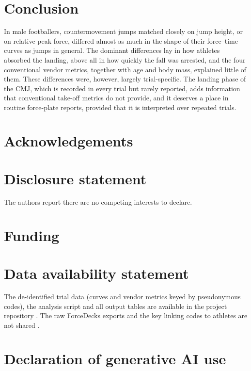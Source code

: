 \section{Conclusion}

In male footballers, countermovement jumps matched closely on jump height, or on relative peak force, differed almost as much in the shape of their force--time curves as jumps in general. The dominant differences lay in how athletes absorbed the landing, above all in how quickly the fall was arrested, and the four conventional vendor metrics, together with age and body mass, explained little of them. These differences were, however, largely trial-specific. The landing phase of the CMJ, which is recorded in every trial but rarely reported, adds information that conventional take-off metrics do not provide, and it deserves a place in routine force-plate reports, provided that it is interpreted over repeated trials.

\section*{Acknowledgements}

\section*{Disclosure statement}
The authors report there are no competing interests to declare. 

\section*{Funding}

\section*{Data availability statement}
The de-identified trial data (curves and vendor metrics keyed by pseudonymous codes), the analysis script and all output tables are available in the project repository . The raw ForceDecks exports and the key linking codes to athletes are not shared .

\section*{Declaration of generative AI use}

